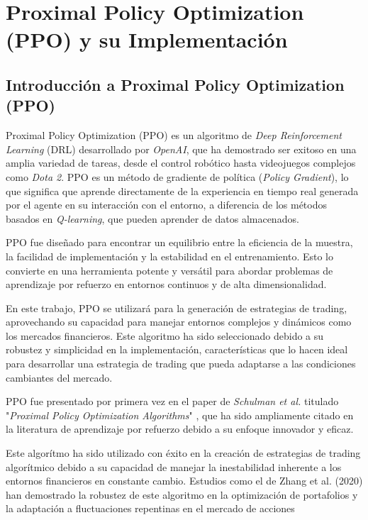 \documentclass[a4paper,12pt, twoside]{report}
\begin{document}
\section{Proximal Policy Optimization (PPO) y su Implementación}

\subsection{Introducción a Proximal Policy Optimization (PPO)}

Proximal Policy Optimization (PPO) es un algoritmo de \textit{Deep Reinforcement Learning} 
(DRL) desarrollado por \textit{OpenAI}, que ha demostrado ser exitoso en una amplia variedad 
de tareas, desde el control robótico hasta videojuegos complejos como \textit{Dota 2}. 
PPO es un método de gradiente de política (\textit{Policy Gradient}), lo que significa 
que aprende directamente de la experiencia en tiempo real generada por el agente en su 
interacción con el entorno, a diferencia de los métodos basados en \textit{Q-learning}, 
que pueden aprender de datos almacenados.

PPO fue diseñado para encontrar un equilibrio entre la eficiencia de la muestra, la facilidad 
de implementación y la estabilidad en el entrenamiento. Esto lo convierte en una herramienta 
potente y versátil para abordar problemas de aprendizaje por refuerzo en entornos continuos y 
de alta dimensionalidad.

En este trabajo, PPO se utilizará para la generación de estrategias de trading, aprovechando 
su capacidad para manejar entornos complejos y dinámicos como los mercados financieros. Este 
algoritmo ha sido seleccionado debido a su robustez y simplicidad en la implementación, 
características que lo hacen ideal para desarrollar una estrategia de trading que pueda 
adaptarse a las condiciones cambiantes del mercado.

PPO fue presentado por primera vez en el paper de \textit{Schulman et al.} titulado 
"\textit{Proximal Policy Optimization Algorithms}" \cite{Schulman2017}, que ha sido ampliamente 
citado en la literatura de aprendizaje por refuerzo debido a su enfoque innovador y eficaz.

Este algorítmo ha sido utilizado con éxito en la creación de estrategias de trading 
algorítmico debido a su capacidad de manejar la inestabilidad inherente a los entornos 
financieros en constante cambio. Estudios como el de Zhang et al. (2020) \cite{pricope2021review} han demostrado 
la robustez de este algoritmo en la optimización de portafolios y la adaptación a fluctuaciones repentinas en el mercado de acciones
\end{document}
